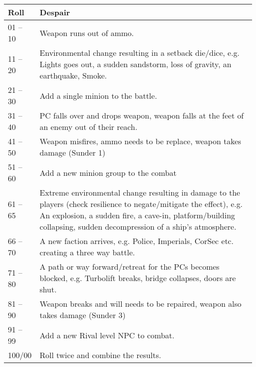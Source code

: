 \documentclass{article}
\begin{document}
\title{\vspace{-0.5cm}{\Huge 100 Despair Rolls} \vspace{-1cm}}

\date{}

\maketitle

\renewcommand{\arraystretch}{1.4}
\begin{center}
	\begin{tabular}{|p{1.5cm}|p{15cm}|}
		\hline 
		\cellcolor{DarkRed} {\large \textcolor{PureWhite}{\textbf{Roll}}} & \cellcolor{DarkRed} {\large \textcolor{PureWhite}{\textbf{Despair}}} \\
		\hline 
		01 -- 10 & Weapon runs out of ammo. \\
		\hline 
		11 -- 20 & Environmental change resulting in a setback die/dice, e.g. Lights goes out, a sudden sandstorm, loss of gravity, an earthquake, Smoke. \\
		\hline 
		21 -- 30 & Add a single minion to the battle. \\
		\hline 
		31 -- 40 & PC falls over and drops weapon, weapon falls at the feet of an enemy out of their reach. \\
		\hline 
		41 -- 50 & Weapon misfires, ammo needs to be replace, weapon takes damage (Sunder 1) \\
		\hline 
		51 -- 60 & Add a new minion group to the combat \\
		\hline 
		61 -- 65 & Extreme environmental change resulting in damage to the players (check resilience to negate/mitigate the effect), e.g. An explosion, a sudden fire, a cave-in, platform/building collapsing, sudden decompression of a ship’s atmosphere. \\
		\hline 
		66 -- 70 & A new faction arrives, e.g. Police, Imperials, CorSec etc. creating a three way battle. \\
		\hline 
		71 -- 80 & A path or way forward/retreat for the PCs becomes blocked, e.g. Turbolift breaks, bridge collapses, doors are shut. \\
		\hline 
		81 -- 90 & Weapon breaks and will needs to be repaired, weapon also takes damage (Sunder 3) \\
		\hline 
		91 -- 99 & Add a new Rival level NPC to combat. \\
		\hline 
		100/00 & Roll twice and combine the results. \\
		\hline 
	\end{tabular}
\end{center}
\end{document}
